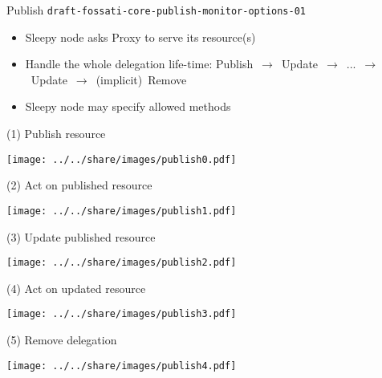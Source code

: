 \documentclass{beamer}
\begin{document}
\begin{frame}{Publish \hspace{5cm} {\tiny \texttt{draft-fossati-core-publish-monitor-options-01}}}

\begin{itemize}
 \item Sleepy node asks Proxy to serve its resource(s)
 \item Handle the whole delegation life-time: \mbox{\small{Publish $\rightarrow$ Update $\rightarrow$ ... $\rightarrow$ Update $\rightarrow$ (implicit) Remove}}
 \item Sleepy node may specify allowed methods %
\end{itemize}

\end{frame}

\begin{frame}{(1) Publish resource}
 \begin{center}
  \texttt{[image: ../../share/images/publish0.pdf]}
 \end{center}
\end{frame}

\begin{frame}{(2) Act on published resource}
 \begin{center}
  \texttt{[image: ../../share/images/publish1.pdf]}
 \end{center}
\end{frame}

\begin{frame}{(3) Update published resource}
 \begin{center}
  \texttt{[image: ../../share/images/publish2.pdf]}
 \end{center}
\end{frame}

\begin{frame}{(4) Act on updated resource}
 \begin{center}
  \texttt{[image: ../../share/images/publish3.pdf]}
 \end{center}
\end{frame}

\begin{frame}{(5) Remove delegation}
 \begin{center}
  \texttt{[image: ../../share/images/publish4.pdf]}
 \end{center}
\end{frame}
\end{document}

